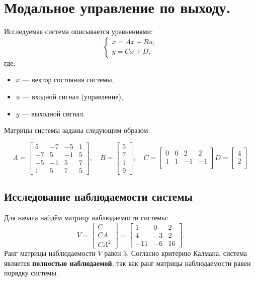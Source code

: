 \section{Модальное управление по выходу.}

Исследуемая система описывается уравнениями:
\[
\begin{cases}
    \dot{x} = Ax + Bu, \\
    y = Cx + D,
\end{cases}
\]
где:
\begin{itemize}
    \item $x$ — вектор состояния системы,
    \item $u$ — входной сигнал (управление),
    \item $y$ — выходной сигнал.
\end{itemize}

Матрицы системы заданы следующим образом:

\[
A = \begin{bmatrix}
    5 & -7 & -5 & 1 \\
    -7 & 5 & -1 & 5 \\
    -5 & -1 & 5 & 7 \\
    1 & 5 & 7 & 5
\end{bmatrix}, \quad
B = \begin{bmatrix}
    5 \\
    7 \\
    1 \\
    9
\end{bmatrix}, \quad
C = \begin{bmatrix}
    0 & 0 & 2 & 2 \\
    1 & 1 & -1 & -1 \\
\end{bmatrix}
D = \begin{bmatrix}
    4 \\
    2 \\
\end{bmatrix}
\]


\subsection{Исследование наблюдаемости системы}

Для начала найдём матрицу наблюдаемости системы:
\[
V = \begin{bmatrix}
    C \\
    CA \\
    CA^2
\end{bmatrix} =
\begin{bmatrix}
    1 & 0 & 2 \\
    4 & -3 & 2 \\
    -11 & -6 & 16
\end{bmatrix}.
\]
Ранг матрицы наблюдаемости $V$ равен 3. Согласно критерию Калмана, система является \textbf{полностью наблюдаемой}, так как ранг матрицы наблюдаемости равен порядку системы.

